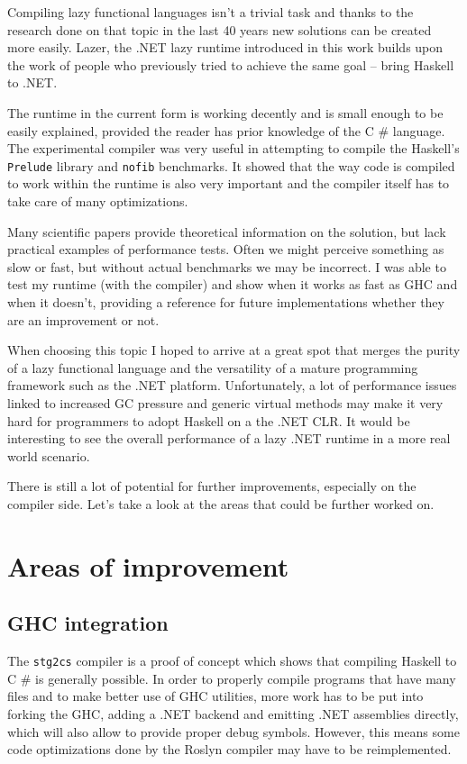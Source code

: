 \documentclass[en]{pracamgr}
\newcommand{\shrp}{%
  {\fontfamily{ppl}\selectfont\#%
  }}
\begin{document}
Compiling lazy functional languages isn't a trivial task
and thanks to the research done on that topic in the last 40 years
new solutions can be created more easily.
Lazer, the .NET lazy runtime introduced in this work builds upon
the work of people who previously tried to achieve the same goal --
bring Haskell to .NET.

The runtime in the current form is working decently and is small enough to be
easily explained, provided the reader has prior knowledge of the C\shrp{} language.
The experimental compiler was very useful in attempting to compile the
Haskell's \texttt{Prelude} library and \texttt{nofib} benchmarks.
It showed that the way code is compiled to work within the runtime is also very important
and the compiler itself has to take care of many optimizations.

Many scientific papers provide theoretical information on the solution,
but lack practical examples of performance tests.
Often we might perceive something as slow or fast, but without actual benchmarks
we may be incorrect.
I was able to test my runtime (with the compiler) and show when it works as fast as GHC and
when it doesn't, providing a reference for future implementations whether they are
an improvement or not.

When choosing this topic I hoped to arrive at a great spot that merges
the purity of a lazy functional language and the versatility of
a mature programming framework such as the .NET platform.
Unfortunately, a lot of performance issues linked to increased
GC pressure and generic virtual methods may make it very hard 
for programmers to adopt Haskell on a the .NET CLR.
It would be interesting to see the overall performance of a lazy .NET runtime
in a more real world scenario.

There is still a lot of potential for further improvements, especially on the compiler side.
Let's take a look at the areas that could be further worked on.

\section{Areas of improvement}
\subsection{GHC integration}
The \texttt{stg2cs} compiler is a proof of concept which shows that compiling Haskell
to C\shrp{} is generally possible. In order to properly compile programs that have many
files and to make better use of GHC utilities, more work has to be put into forking the GHC,
adding a .NET backend and emitting .NET assemblies directly,
which will also allow to provide proper debug symbols.
However, this means some code optimizations done by the Roslyn compiler
may have to be reimplemented.
\end{document}
